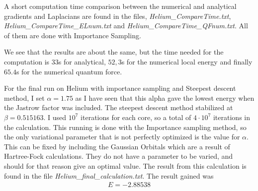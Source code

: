 \documentclass[a4paper, 12pt, titlepage]{article}
\begin{document}
 A short computation time comparison between the numerical and analytical gradients and Laplacians are found in the files, \textit{Helium\_CompareTime.txt}, \textit{Helium\_CompareTime\_ELnum.txt} and \textit{Helium\_CompareTime\_QFnum.txt}. All of them are done with Importance Sampling. 

 We see that the results are about the same, but the time needed for the computation is $33$s for analytical, $52,3$s for the numerical local energy and finally $65.4$s for the numerical quantum force. 

 For the final run on Helium with importance sampling and Steepest descent method, I set $\alpha = 1.75$ as I have seen that this alpha gave the lowest energy when the Jastrow factor was included. The steepest descent method stabilized at $\beta = 0.515163$. I used $10^7$ iterations for each core, so a total of $4 \cdot 10^7$ iterations in the calculation. This running is done with the Importance sampling method, so the only variational parameter that is not perfectly optimized is the value for $\alpha$. This can be fixed by including the Gaussian Orbitals which are a result of Hartree-Fock calculations. They do not have a parameter to be varied, and should for that reason give an optimal value. The result from this calculation is found in the file \textit{Helium\_final\_calculation.txt}. The result gained was
 \begin{align*}
 	E = -2.88538
 \end{align*}
\end{document}
